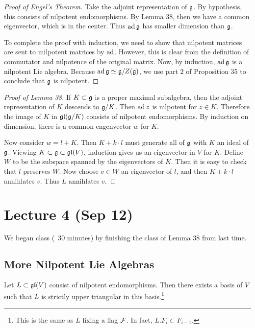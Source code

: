 \documentclass[twoside, 10pt]{article}
\begin{document}
    \begin{proof}[Proof of Engel's Theorem] Take the adjoint representation of
        $\mathfrak{g}$. By hypothesis, this consists of nilpotent endomorphisms. By
        Lemma 38, then we have a common eigenvector, which is in the center.
        Thus $\operatorname{ad} \mathfrak{g}$ has smaller dimension than $\mathfrak{g}$.
        
        To complete the proof with induction, we need to show that nilpotent
    matrices are sent to milpotent matrices by $\operatorname{ad}$. However, this is clear
from the definition of commutator and nilpotence of the original matrix. Now,
by induction, $\operatorname{ad} \mathfrak{g}$ is a nilpotent Lie algebra. Because $\operatorname{ad} \mathfrak{g}
\simeq \mathfrak{g} / Z(\mathfrak{g})$, we use part $2$ of Proposition 35 to conclude that
$\mathfrak{g}$ is nilpotent.  \end{proof}

    \begin{proof}[Proof of Lemma 38] If $K \subset \mathfrak{g}$ is a proper maximal
        subalgebra, then the adjoint representation of $K$ descends to
        $\mathfrak{g}/K$. Then $\operatorname{ad} z$ is nilpotent for $z \in K$. Therefore the
        image of $K$ in $\mathfrak{gl}(\mathfrak{g}/K)$ consists of nilpotent
        endomorphisms. By induction on dimension, there is a common engenvector
        $w$ for $K$.

        Now consider $w = l+K$. Then $K + k \cdot l$ must generate all of
    $\mathfrak{g}$ with $K$ an ideal of $\mathfrak{g}$. Viewing $K \subset \mathfrak{g} \subset
\mathfrak{gl}(V)$, induction gives us an eigenvector in $V$ for $K$. Define $W$ to be
the subspace spanned by the eigenvectors of $K$. Then it is easy to check that
$l$ preserves $W$. Now choose $v \in W$ an eigenvector of $l$, and then $K + k
\cdot l$ annihlates $v$. Thus $L$ annihlates $v$.  \end{proof}

    \section{Lecture 4 (Sep 12)}%

    We began class (~30 minutes) by finishing the class of Lemma 38 from last
    time.

    \subsection{More Nilpotent Lie Algebras}%
    \label{sub:more_nilpotent_lie_algebras}
    
    
    \begin{cor} Let $L \subset \mathfrak{gl}(V)$ consist of nilpotent endomorphisms.
        Then there exists a basis of $V$ such that $L$ is strictly upper
        triangular in this basis.\footnote{This is the same as $L$ fixing a
        flag $\mathcal{F}$. In fact, $L.F_i \subset F_{i-1}$.} \end{cor}
\end{document}
